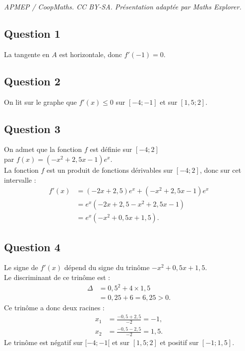 \documentclass[10pt]{article}
\begin{document}
\noindent\textit{APMEP / CoopMaths. CC BY-SA. Présentation adaptée par Maths Explorer.}\par\medskip
\subsection*{Question 1}

La tangente en $A$ est horizontale, donc $f'(-1) = 0$.

\subsection*{Question 2}

On lit sur le graphe que $f'(x) \leq 0$ sur $[-4 ; -1]$ et sur $[1,5 ; 2]$.

\subsection*{Question 3}

On admet que la fonction $f$ est définie sur $[-4 ; 2]$ \\
par $f(x) = (-x^2 + 2,5x - 1)e^x$.\\
La fonction $f$ est un produit de fonctions dérivables sur $[-4 ; 2]$, donc sur cet intervalle :
\begin{align*}
	f'(x) &= (-2x + 2,5)e^x + (-x^2 + 2,5x - 1)e^x \\
	&= e^x \left( -2x + 2,5 - x^2 + 2,5x - 1 \right) \\
	&= e^x (-x^2 + 0,5x + 1,5).
\end{align*}

\subsection*{Question 4}

Le signe de $f'(x)$ dépend du signe du trinôme $-x^2 + 0,5x + 1,5$.\\
Le discriminant de ce trinôme est :
\begin{align*}
	\Delta &= 0,5^2 + 4 \times 1,5 \\
	&= 0,25 + 6 = 6,25 > 0.
\end{align*}
Ce trinôme a donc deux racines :
\begin{align*}
	x_1 &= \frac{-0,5 + 2,5}{-2} = -1, \\
	x_2 &= \frac{-0,5 - 2,5}{-2} = 1,5.
\end{align*}
Le trinôme est négatif sur $[-4 ; -1[$ et sur $[1,5 ; 2]$ et positif sur $[-1 ; 1,5]$.
\end{document}

